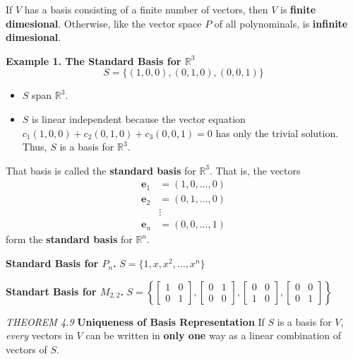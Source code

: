 \documentclass{article}
\newcommand\B{\textbf}
\newcommand\tcl{\begin{tcolorbox}[colback = {blue9}]}
\newcommand\etcl{\end{tcolorbox}}
\begin{document}
\begin{tcolorbox}
    If $V$ has a basis consisting of a finite number of vectors, then $V$ is \B{finite dimesional}.
    Otherwise, like the vector space $P$ of all polynominals, is \B{infinite dimesional}.

    \B{Example 1. The Standard Basis for $\mathbb{R}^3$} 
    \[ S = \{ (1, 0, 0), (0, 1, 0), (0, 0, 1) \} \]
    \begin{itemize}
        \item $S$ span $\mathbb{R}^3$.
        \item $S$ is linear independent because the vector equation $c_1(1,0,0) + c_2(0,1,0) + c_3(0,0,1) = 0 $ 
            has only the trivial solution. Thus, $S$ is a basis for $\mathbb{R}^3$. 
    \end{itemize}
    That basis is called the \B{standard basis} for $\mathbb{R}^3$.  That is, the vectors
    \begin{equation*}
        \begin{split}
            \B{e}_1 & = (1,0,\dots,0)\\
            \B{e}_2 & = (0,1,\dots,0)\\
                    &\vdots\\
            \B{e}_n & = (0,0,\dots,1)
        \end{split}
    \end{equation*}
    form the \B{standard basis} for $\mathbb{R}^n$.

    \B{Standard Basis for $P_n$. } $S = \{1, x, x^2, \dots, x^n\}$

    \B{Standart Basis for $M_{2,2}$.} $S = \left\{\begin{bmatrix}
            1  & 0 \\ 0 & 1
    \end{bmatrix}, \begin{bmatrix}
            0 & 1 \\ 0 & 0
    \end{bmatrix}, \begin{bmatrix}
            0 & 0 \\ 1 & 0
    \end{bmatrix}, \begin{bmatrix}
            0 & 0 \\ 0 & 1
    \end{bmatrix}
    \right\}$

    \tcl
    \textit{THEOREM 4.9} \quad \textbf{Uniqueness of Basis Representation}
        If $S$ is a basis for $V$, \textit{every} vectors in $V$ can be written in \textbf{only one} way as a linear
        combination of vectors of $S$.
    \etcl 


\end{tcolorbox}
\end{document}
